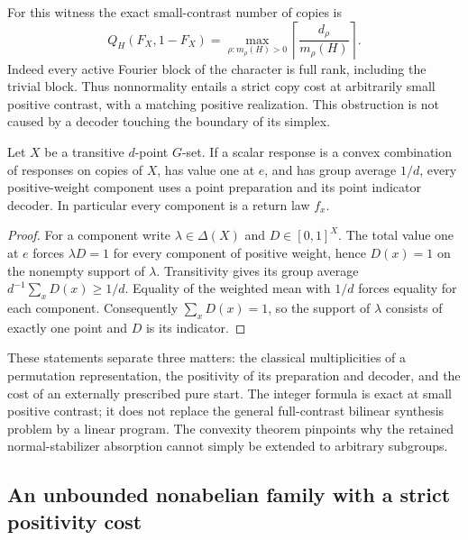 For this witness the exact small-contrast number of copies is
\begin{equation}\label{eq:r75-character-copies}
 Q_H(F_X,1-F_X)
 =\max_{\rho:m_\rho(H)>0}
   \left\lceil\frac{d_\rho}{m_\rho(H)}\right\rceil.
\end{equation}
Indeed every active Fourier block of the character is full rank,
including the trivial block. Thus nonnormality entails a strict copy
cost at arbitrarily small positive contrast, with a matching positive
realization. This obstruction is not caused by a decoder touching the
boundary of its simplex.

\begin{lemma}
\label{lem:r75-return-rigidity}
Let $X$ be a transitive $d$-point $G$-set. If a scalar response is a
convex combination of responses on copies of $X$, has value one at
$e$, and has group average $1/d$, every positive-weight component
uses a point preparation and its point indicator decoder. In
particular every component is a return law $f_x$.
\end{lemma}
\begin{proof}
For a component write $\lambda\in\Delta(X)$ and $D\in[0,1]^X$.
The total value one at $e$ forces $\lambda D=1$ for every component
of positive weight, hence $D(x)=1$ on the nonempty support of
$\lambda$. Transitivity gives its group average
$d^{-1}\sum_xD(x)\ge1/d$. Equality of the weighted mean with $1/d$
forces equality for each component. Consequently $\sum_xD(x)=1$,
so the support of $\lambda$ consists of exactly one point and $D$
is its indicator.
\end{proof}

These statements separate three matters: the classical multiplicities
of a permutation representation, the positivity of its preparation
and decoder, and the cost of an externally prescribed pure start.
The integer formula is exact at small positive contrast; it does not
replace the general full-contrast bilinear synthesis problem by a
linear program. The convexity theorem pinpoints why the retained
normal-stabilizer absorption cannot simply be extended to arbitrary
subgroups.

\subsection{An unbounded nonabelian family with a strict positivity cost}
\label{sec:r75-symmetric-return}

